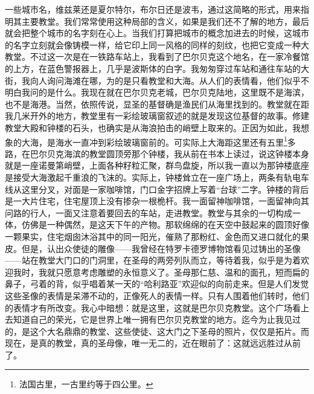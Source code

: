 \par 一些城市名，维兹莱还是夏尔特尔，布尔日还是波韦，通过这简略的形式，用来指明其主要教堂。我们常常使用这种局部的含义，如果是我们还不了解的地方，最后就会把整个城市的名字刻在心上。当我们打算把城市的概念加进去的时候，这城市的名字立刻就会像铸模一样，给它印上同一风格的同样的刻纹，也把它变成一种大教堂。不过这一次是在一铁路车站上，我看到了巴尔贝克这个地名，在一家冷餐馆的上方，在蓝色警报器上，几乎是波斯体的白字。我匆匆穿过车站和通往车站的大街，我向人询问海滩在哪，为的是只看教堂和大海。从人们的表情看，他们似乎不明白我问的是什么。我现在就在巴尔贝克老城，巴尔贝克陆地，这里既不是海滨，也不是海港。当然，依照传说，显圣的基督确是渔民们从海里找到的。教堂就在距我几米开外的地方，教堂里有一彩绘玻璃窗叙述的就是发现这位基督的故事。修建教堂大殿和钟楼的石头，也确实是从海浪拍击的峭壁上取来的。正因为如此，我想象的大海，是海水一直冲到彩绘玻璃窗前的。可实际上大海距这里还有五里\footnote{法国古里，一古里约等于四公里。}多路，在巴尔贝克海滨的教堂圆顶旁那个钟楼，我从前在书本上读过，说这钟楼本身就是一座诺曼第峭壁，上面各种籽粒汇聚，群鸟盘旋，所以我一直以为那钟楼底座是接受大海激起千重浪的飞沫的。实际上，钟楼耸立在一座广场上，两条有轨电车线从这里分叉，对面是一家咖啡馆，门口金字招牌上写着“台球”二字。钟楼的背后是一大片住宅，住宅屋顶上没有掺杂一根桅杆。我一面留神咖啡馆，一面留神向其问路的行人，一面又注意着要回去的车站，走进教堂。教堂与其余的一切构成一体，仿佛是一种偶然，是这天下午的产物。那软绵绵的在天空中鼓起来的圆顶好像一颗果实，住宅烟囱沐浴其中的同一阳光，催熟了那粉红、金色而又进口就化的果皮。但是，认出众使徒的雕像——我曾经在特罗卡德罗博物馆看见过铸出的圣像——站在教堂大门口的门洞里，在圣母的两旁列队而立，等待着我，似乎是为着欢迎我时，我就只愿意考虑雕塑的永恒意义了。圣母那仁慈、温和的面孔，短而扁的鼻子，弓着的背，似乎唱着某一天的“哈利路亚”欢迎似的向前走来。但是人们发觉这些圣像的表情是呆滞不动的，正像死人的表情一样。只有人围着他们转时，他们的表情才有所改变。我心中暗想：就是这里，这就是巴尔贝克教堂。这个广场看上去知道自己的荣光，它是世界上唯一拥有巴尔贝克教堂的地方。迄今为止我见过的，是这个大名鼎鼎的教堂、这些使徒、这大门之下圣母的照片，仅仅是拓片。而现在，是真的教堂，真的圣母像，唯一无二的，近在眼前了：这就远远胜过从前了。
